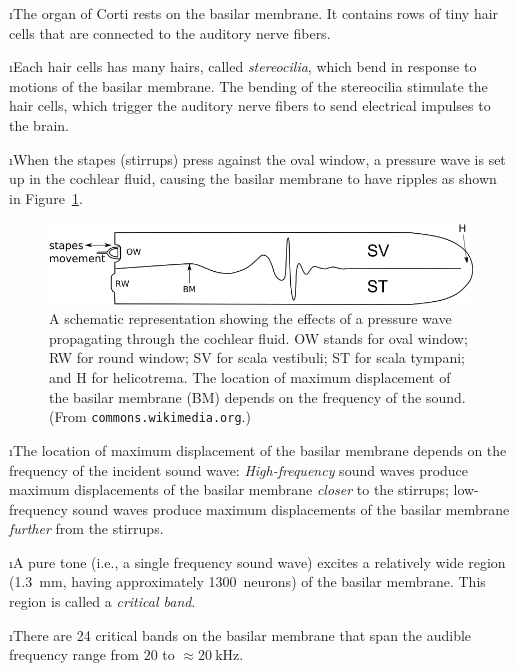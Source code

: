 \i The organ of Corti rests on the basilar membrane.
It contains rows of tiny hair cells that are connected to
the auditory nerve fibers.

\i Each hair cells has many hairs, called {\em stereocilia},
which bend in response to motions of the basilar membrane.
The bending of the stereocilia stimulate the hair cells,
which trigger the auditory nerve fibers to send electrical
impulses to the brain.

\i When the stapes (stirrups) press against the oval window,
a pressure wave is set up in the cochlear fluid, causing
the basilar membrane to have ripples as shown in 
Figure~\ref{f:cochlea-uncoiled-schematic}.
%
\begin{figure}[htbp]
\begin{center}
\includegraphics[width=.8\textwidth]{cochlea-uncoiled-schematic.png}
\caption{A schematic representation showing the effects of
a pressure wave propagating through the cochlear fluid.
OW stands for oval window; RW for round window;
SV for scala vestibuli; ST for scala tympani; and
H for helicotrema.
The location of maximum displacement of the basilar membrane
(BM) depends on the frequency of the sound.
(From {\tt commons.wikimedia.org}.)}
\label{f:cochlea-uncoiled-schematic}
\end{center}
\end{figure}
%

\i The location of maximum displacement of the basilar 
membrane depends on the frequency of the incident sound wave:
{\em High-frequency} sound waves produce maximum displacements 
of the basilar membrane {\em closer} to the stirrups;
{low-frequency} sound waves produce maximum displacements 
of the basilar membrane {\em further} from the stirrups.

\i A pure tone (i.e., a single frequency sound wave)
excites a relatively wide region (1.3~mm, having 
approximately 1300~neurons) of the basilar membrane.
This region is called a {\em critical band}.

\i There are 24 critical bands on the basilar membrane
that span the audible frequency range from $20$ to $\approx 20~$kHz.

